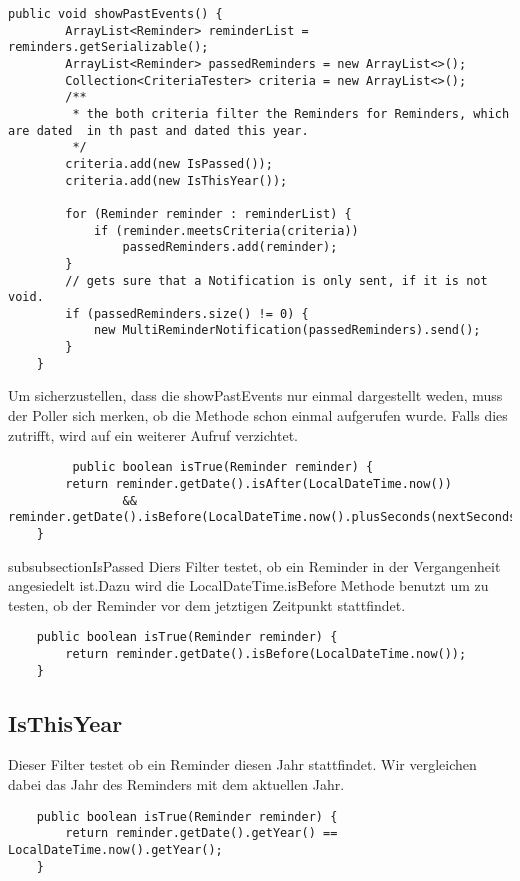 \begin{lstlisting}[caption = NotificationHandler.showPastEvents]
     public void showPastEvents() {
        ArrayList<Reminder> reminderList = reminders.getSerializable();
        ArrayList<Reminder> passedReminders = new ArrayList<>();
        Collection<CriteriaTester> criteria = new ArrayList<>();
        /**
         * the both criteria filter the Reminders for Reminders, which are dated  in th past and dated this year.
         */
        criteria.add(new IsPassed());
        criteria.add(new IsThisYear());

        for (Reminder reminder : reminderList) {
            if (reminder.meetsCriteria(criteria))
                passedReminders.add(reminder);
        }
        // gets sure that a Notification is only sent, if it is not void.
        if (passedReminders.size() != 0) {
            new MultiReminderNotification(passedReminders).send();
        }
    }
\end{lstlisting}

Um sicherzustellen, dass die showPastEvents nur einmal dargestellt weden, muss der Poller sich merken, ob die Methode schon einmal aufgerufen wurde. Falls dies zutrifft, wird auf ein weiterer Aufruf verzichtet.
  \begin{lstlisting}
         public boolean isTrue(Reminder reminder) {
        return reminder.getDate().isAfter(LocalDateTime.now())
                && reminder.getDate().isBefore(LocalDateTime.now().plusSeconds(nextSeconds));
    }
    \end{lstlisting}


subsubsection{IsPassed}
    Diers Filter testet, ob ein Reminder in der Vergangenheit angesiedelt ist.Dazu wird die LocalDateTime.isBefore Methode benutzt um zu testen, ob der Reminder vor dem jetztigen Zeitpunkt stattfindet.
    \begin{lstlisting}
    public boolean isTrue(Reminder reminder) {
        return reminder.getDate().isBefore(LocalDateTime.now());
    }
    \end{lstlisting}
    
     \subsection{IsThisYear}
    Dieser Filter testet ob ein Reminder diesen Jahr stattfindet. Wir vergleichen dabei das Jahr des Reminders mit dem aktuellen Jahr.
    
    \begin{lstlisting}
    public boolean isTrue(Reminder reminder) {
        return reminder.getDate().getYear() == LocalDateTime.now().getYear();
    }
    \end{lstlisting}

